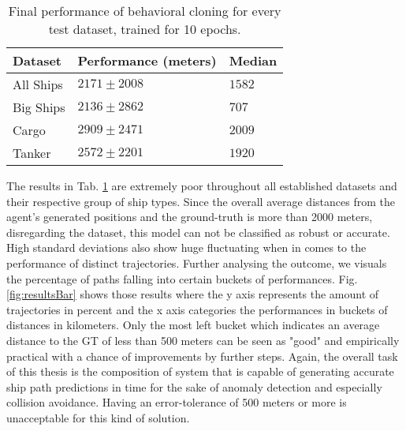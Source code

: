 \begin{table}[H]
\centering
\begin{tabular}{|l|l|l|}
\hline
\textbf{Dataset} & \textbf{Performance (meters)}  & \textbf{Median} \\ \hline
All Ships        & $2171 \pm 2008$                & $1582$          \\ \hline
Big Ships        & $2136 \pm 2862$                & $707$           \\ \hline
Cargo            & $2909 \pm 2471$                & $2009$          \\ \hline
Tanker           & $2572 \pm 2201$ & $1920$          \\ \hline
\end{tabular}
\label{tab:rlResults}
\caption{Final performance of behavioral cloning for every test dataset, trained for 10 epochs.}
\end{table}
The results in Tab. \ref{tab:rlResults} are extremely poor throughout all established datasets and their respective group of ship types. Since the overall average distances from the agent's generated positions and the ground-truth is more than 2000 meters, disregarding the dataset, this model can not be classified as robust or accurate. High standard deviations also show huge fluctuating when in comes to the performance of distinct trajectories. Further analysing the outcome, we visuals the percentage of paths falling into certain buckets of performances. Fig. \ref{fig:resultsBar} shows those results where the y axis represents the amount of trajectories in percent and the x axis categories the performances in buckets of distances in kilometers. Only the most left bucket which indicates an average distance to the GT of less than 500 meters can be seen as "good" and empirically practical with a chance of improvements by further steps. Again, the overall task of this thesis is the composition of system that is capable of generating accurate ship path predictions in time for the sake of anomaly detection and especially collision avoidance. Having an error-tolerance of 500 meters or more is unacceptable for this kind of solution.

